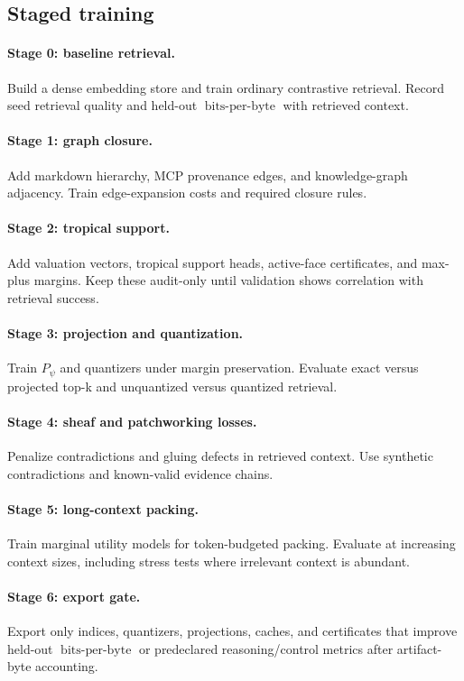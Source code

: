 \documentclass[11pt]{article}
\theoremstyle{definition}
\theoremstyle{remark}
\newcommand{\bits}{\ensuremath{\operatorname{bits\text{-}per\text{-}byte}}}
\begin{document}
\subsection{Staged training}

\paragraph{Stage 0: baseline retrieval.} Build a dense embedding store and train ordinary contrastive retrieval. Record seed retrieval quality and held-out \bits{} with retrieved context.

\paragraph{Stage 1: graph closure.} Add markdown hierarchy, MCP provenance edges, and knowledge-graph adjacency. Train edge-expansion costs and required closure rules.

\paragraph{Stage 2: tropical support.} Add valuation vectors, tropical support heads, active-face certificates, and max-plus margins. Keep these audit-only until validation shows correlation with retrieval success.

\paragraph{Stage 3: projection and quantization.} Train \(P_\psi\) and quantizers under margin preservation. Evaluate exact versus projected top-k and unquantized versus quantized retrieval.

\paragraph{Stage 4: sheaf and patchworking losses.} Penalize contradictions and gluing defects in retrieved context. Use synthetic contradictions and known-valid evidence chains.

\paragraph{Stage 5: long-context packing.} Train marginal utility models for token-budgeted packing. Evaluate at increasing context sizes, including stress tests where irrelevant context is abundant.

\paragraph{Stage 6: export gate.} Export only indices, quantizers, projections, caches, and certificates that improve held-out \bits{} or predeclared reasoning/control metrics after artifact-byte accounting.
\end{document}
